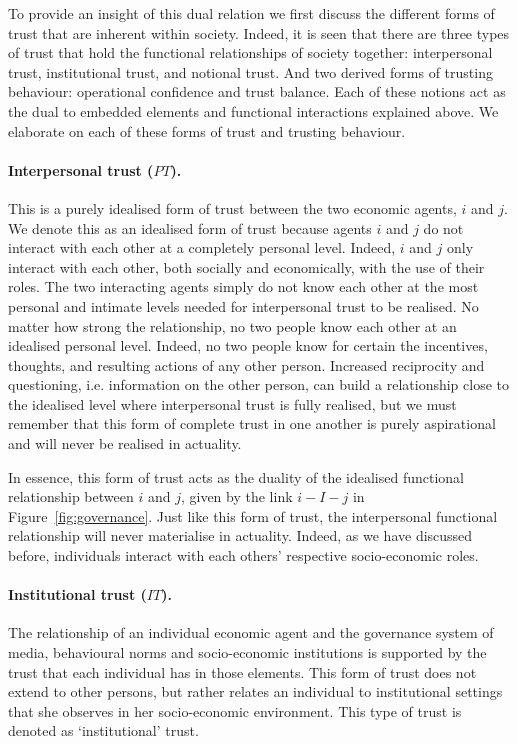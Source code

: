 \begin{subappendices}
To provide an insight of this dual relation we first discuss the different forms of trust that are inherent within society. Indeed, it is seen that there are three types of trust that hold the functional relationships of society together: interpersonal trust, institutional trust, and notional trust. And two derived forms of trusting behaviour: operational confidence and trust balance. Each of these notions act as the dual to embedded elements and functional interactions explained above. We elaborate on each of these forms of trust and trusting behaviour.

\paragraph{Interpersonal trust ($PT$).}

This is a purely idealised form of trust between the two economic agents, $i$ and $j$. We denote this as an idealised form of trust because agents $i$ and $j$ do not interact with each other at a completely personal level. Indeed, $i$ and $j$ only interact with each other, both socially and economically, with the use of their roles. The two interacting agents simply do not know each other at the most personal and intimate levels needed for interpersonal trust to be realised. No matter how strong the relationship, no two people know each other at an idealised personal level. Indeed, no two people know for certain the incentives, thoughts, and resulting actions of any other person. Increased reciprocity and questioning, i.e. information on the other person, can build a relationship close to the idealised level where interpersonal trust is fully realised, but we must remember that this form of complete trust in one another is purely aspirational and will never be realised in actuality.

In essence, this form of trust acts as the duality of the idealised functional relationship between $i$ and $j$, given by the link $i-I-j$ in Figure~\ref{fig:governance}. Just like this form of trust, the interpersonal functional relationship will never materialise in actuality. Indeed, as we have discussed before, individuals interact with each others' respective socio-economic roles.

\paragraph{Institutional trust ($IT$).}

The relationship of an individual economic agent and the governance system of media, behavioural norms and socio-economic institutions is supported by the trust that each individual has in those elements. This form of trust does not extend to other persons, but rather relates an individual to institutional settings that she observes in her socio-economic environment. This type of trust is denoted as `institutional' trust.


\end{subappendices}
